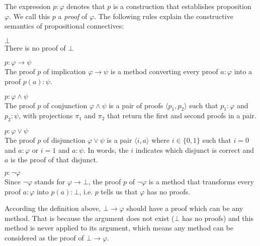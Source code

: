 \begin{definition}
The expression $ p : \varphi $ denotes that $ p $ is a construction that establishes proposition $ \varphi $. We call this $ p $ a \emph{proof} of $ \varphi $. The following rules explain the constructive semantics of propositional connectives:
\begin{myitemize}
\item $ \bot $\\
There is no proof of $ \bot $
\item $ p: \varphi \to \psi $\\
The proof $ p $ of implication $ \varphi \to \psi $ is a method converting every proof $ a : \varphi $ into a proof $ p(a): \psi $.
\item $ p: \varphi \land \psi $\\
The proof $ p $ of conjunction $ \varphi \land \psi $ is a pair of proofs $ \langle p_1 , p_2 \rangle $ such that $ p_1:\varphi $ and $ p_2:\psi $, with projections $ \pi _1 $ and $ \pi _2 $ that return the first and second proofs in a pair.
\item $ p: \varphi \lor \psi $\\
The proof $ p $ of disjunction $ \varphi \lor \psi $ is a pair $ \langle i , a \rangle $ where $ i \in \{ 0,1 \} $ such that $ i = 0 $ and $ a : \varphi $ or $ i = 1 $ and $ a : \psi $. In words, the $ i $ indicates which disjunct is correct and $ a $ is the proof of that disjunct.
\item $ p: \neg \varphi $\\
Since $ \neg \varphi $ stands for $ \varphi \to \bot $, the proof $ p $ of $ \neg \varphi $ is a method that transforms every proof $ a: \varphi $ into $ p(a): \bot$, i.e. $ p $ tells us that $ \varphi $ has no proofs.
\end{myitemize}
\end{definition}

According the definition above, $ \bot \to \varphi $ should have a proof which can be any method. That is because the argument does not exist ($ \bot $ has no proofs) and this method is never applied to its argument, which means any method can be considered as the proof of $ \bot \to \varphi $.

